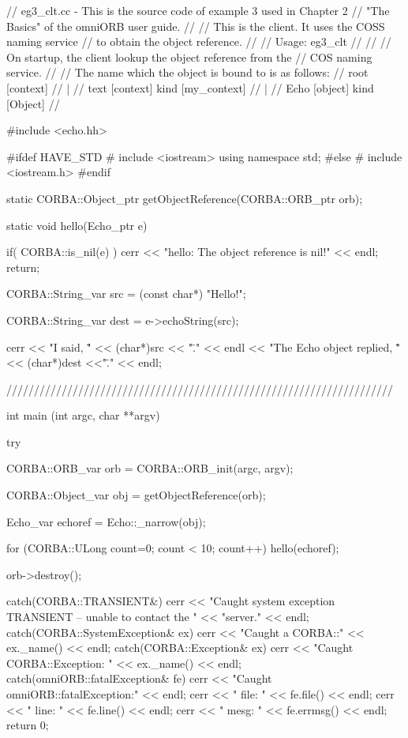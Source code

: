 \documentclass[11pt,twoside,a4paper]{book}
\begin{document}
\begin{cxxlisting}
// eg3_clt.cc - This is the source code of example 3 used in Chapter 2
//              "The Basics" of the omniORB user guide.
//
//              This is the client. It uses the COSS naming service
//              to obtain the object reference.
//
// Usage: eg3_clt
//
//
//        On startup, the client lookup the object reference from the
//        COS naming service.
//
//        The name which the object is bound to is as follows:
//              root  [context]
//               |
//              text  [context] kind [my_context]
//               |
//              Echo  [object]  kind [Object]
//

#include <echo.hh>

#ifdef HAVE_STD
#  include <iostream>
   using namespace std;
#else
#  include <iostream.h>
#endif

static CORBA::Object_ptr getObjectReference(CORBA::ORB_ptr orb);

static void hello(Echo_ptr e)
{
  if( CORBA::is_nil(e) ) {
    cerr << "hello: The object reference is nil!\n" << endl;
    return;
  }

  CORBA::String_var src = (const char*) "Hello!";

  CORBA::String_var dest = e->echoString(src);

  cerr << "I said, \"" << (char*)src << "\"." << endl
       << "The Echo object replied, \"" << (char*)dest <<"\"." << endl;
}

//////////////////////////////////////////////////////////////////////

int
main (int argc, char **argv) 
{
  try {
    CORBA::ORB_var orb = CORBA::ORB_init(argc, argv);

    CORBA::Object_var obj = getObjectReference(orb);

    Echo_var echoref = Echo::_narrow(obj);

    for (CORBA::ULong count=0; count < 10; count++)
      hello(echoref);

    orb->destroy();
  }
  catch(CORBA::TRANSIENT&) {
    cerr << "Caught system exception TRANSIENT -- unable to contact the "
         << "server." << endl;
  }
  catch(CORBA::SystemException& ex) {
    cerr << "Caught a CORBA::" << ex._name() << endl;
  }
  catch(CORBA::Exception& ex) {
    cerr << "Caught CORBA::Exception: " << ex._name() << endl;
  }
  catch(omniORB::fatalException& fe) {
    cerr << "Caught omniORB::fatalException:" << endl;
    cerr << "  file: " << fe.file() << endl;
    cerr << "  line: " << fe.line() << endl;
    cerr << "  mesg: " << fe.errmsg() << endl;
  }
  return 0;
}


\end{cxxlisting}
\end{document}
